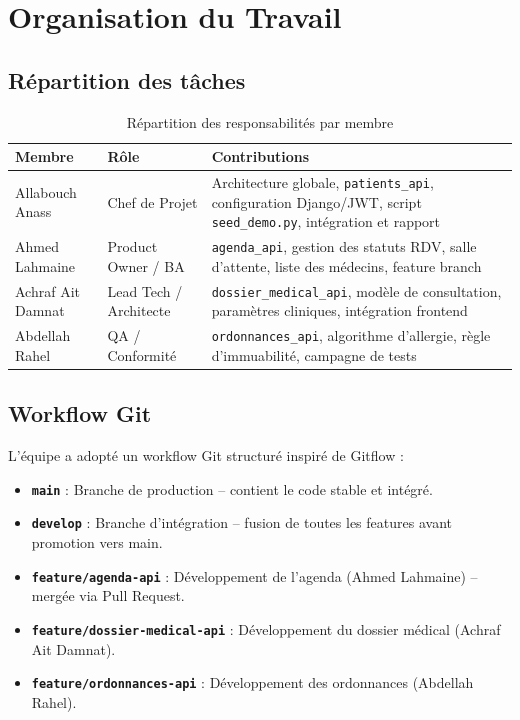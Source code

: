 \documentclass[12pt,a4paper]{report}
\begin{document}
\chapter{Organisation du Travail}

\section{Répartition des tâches}

\begin{table}[H]
\centering
\caption{Répartition des responsabilités par membre}
\renewcommand{\arraystretch}{1.4}
\begin{tabularx}{\textwidth}{|p{3.5cm}|p{3cm}|X|}
  \hline
  \rowcolor{medaccent}
  \textbf{Membre} & \textbf{Rôle} & \textbf{Contributions} \\
  \hline
  Allabouch Anass & Chef de Projet & Architecture globale, \texttt{patients\_api}, configuration Django/JWT, script \texttt{seed\_demo.py}, intégration et rapport \\
  \hline
  Ahmed Lahmaine & Product Owner / BA & \texttt{agenda\_api}, gestion des statuts RDV, salle d'attente, liste des médecins, feature branch \\
  \hline
  Achraf Ait Damnat & Lead Tech / Architecte & \texttt{dossier\_medical\_api}, modèle de consultation, paramètres cliniques, intégration frontend \\
  \hline
  Abdellah Rahel & QA / Conformité & \texttt{ordonnances\_api}, algorithme d'allergie, règle d'immuabilité, campagne de tests \\
  \hline
\end{tabularx}
\end{table}

\section{Workflow Git}

L'équipe a adopté un workflow Git structuré inspiré de Gitflow :

\begin{itemize}[leftmargin=*]
  \item \textbf{\texttt{main}} : Branche de production -- contient le code stable et intégré.
  \item \textbf{\texttt{develop}} : Branche d'intégration -- fusion de toutes les features avant promotion vers main.
  \item \textbf{\texttt{feature/agenda-api}} : Développement de l'agenda (Ahmed Lahmaine) -- mergée via Pull Request.
  \item \textbf{\texttt{feature/dossier-medical-api}} : Développement du dossier médical (Achraf Ait Damnat).
  \item \textbf{\texttt{feature/ordonnances-api}} : Développement des ordonnances (Abdellah Rahel).
\end{itemize}
\end{document}
